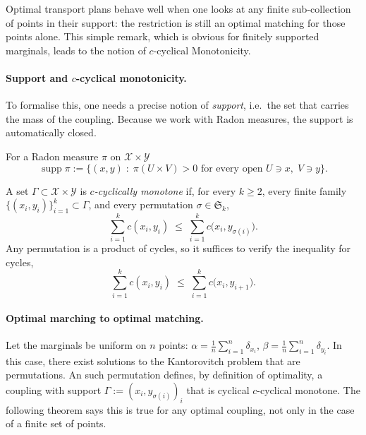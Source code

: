 Optimal transport plans behave well when one looks at any finite
sub-collection of points in their support: the restriction is still an
optimal matching for those points alone. This simple remark, which is obvious for finitely supported marginals, leads to the notion of $c$-cyclical Monotonicity.

\paragraph{Support and $c$-cyclical monotonicity.}

To formalise this, one needs a precise notion of \emph{support}, i.e.\ the set that carries the mass of the coupling.  
Because we work with Radon measures, the support is automatically closed.

\begin{defn}[Support]\label{def:support}
For a Radon measure $\pi$ on $\mathcal{X}\times \mathcal{Y}$
\[
  \operatorname{supp}\pi
  :=\bigl\{(x,y)\;:\;
  \pi(U\times V)>0 \text{ for every open }U\ni x,\;V\ni y\bigr\}.
\]
\end{defn}

\begin{defn}\label{def:ccm}
A set $\Gamma\subset \mathcal{X}\times \mathcal{Y}$ is \emph{$c$-cyclically monotone} if,  
for every $k\ge2$, every finite family
$\{(x_i,y_i)\}_{i=1}^k\subset\Gamma$, and every permutation
$\sigma\in\mathfrak{S}_k$,
\[
  \sum_{i=1}^k c(x_i,y_i)\;\le\;
  \sum_{i=1}^k c\bigl(x_i,y_{\sigma(i)}\bigr).
\]
Any permutation is a product of cycles, so it suffices to verify the
inequality for cycles, 
\[
  \sum_{i=1}^k c(x_i,y_i)\;\le\;
  \sum_{i=1}^k c\bigl(x_i,y_{i+1}\bigr).
\]
\end{defn}

\paragraph{Optimal marching to optimal matching.}

Let the marginals be uniform on $n$ points: $\alpha=\tfrac1n\sum_{i=1}^n\delta_{x_i}$, $\beta =\tfrac1n\sum_{i=1}^n\delta_{y_i}$.
In this case, there exist solutions to the Kantorovitch problem that are permutations. 
An such permutation defines, by definition of optimality, a coupling with support $\Gamma := (x_i,y_{\sigma(i)})_i$ that is cyclical $c$-cyclical monotone. 
The following theorem says this is true for any optimal coupling, not only in the case of a finite set of points.

